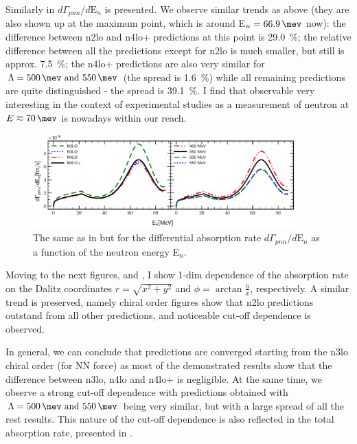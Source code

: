     Similarly in  $d\Gamma_{pnn} /d\text{E}_n$ is presented. We observe similar trends as above
    (they are also shown up at the maximum point, which is around E$_n = \SI{66.9}{\mev}$ now):
    the difference between \gls{n2lo} and \gls{n4lo+} predictions at this point is \SI{29.0}{\percent};
    the relative difference between all the predictions except for \gls{n2lo}
    is much smaller, but still is approx. \SI{7.5}{\percent};
    the \gls{n4lo+} predictions are also very similar for $\Lambda=\SIlist{500;550}{\mev}$ (the spread is \SI{1.6}{\percent})
    while all remaining predictions are quite distinguished - the spread is \SI{39.1}{\percent}.
    I find that observable very interesting in the context of experimental studies as a measurement of neutron at
    $E\eqsim\SI{70}{\mev}$ is nowadays within our reach. 


    \begin{figure}[h]
        \begin{center}
        \includegraphics[width=0.9\textwidth]{PlotData/PION/Dalitz_maps/figures/3HE_dGdEn.pdf}
        \end{center}
        \caption{The same as in  but for the differential absorption rate $d\Gamma_{pnn} /d\text{E}_n$
        as a function of the neutron energy E$_n$.}
        \label{pion_dGdEn}
    \end{figure}

    Moving to the next figures,  and , I show 1-dim dependence of the
    absorption rate on the Dalitz coordinates $r = \sqrt{x^2 + y^2}$  and $\phi = \arctan \frac{y}{x}$, respectively.
    A similar trend is preserved, namely chiral order figures show that \gls{n2lo} predictions
    outstand from all other predictions, and noticeable cut-off dependence is observed.

    In general, we can conclude that predictions are converged starting from the \gls{n3lo} chiral order (for NN force) as
    most of the demonstrated results show that the difference between \gls{n3lo}, \gls{n4lo} and 
    \gls{n4lo+} is negligible. At the same time, we observe a strong cut-off dependence with
    predictions obtained with $\Lambda=\SIlist{500;550}{\mev}$ being very similar,
    but with a large spread of all the rest results.
    This nature of the cut-off dependence is also reflected in the total absorption 
    rate, presented in . 

